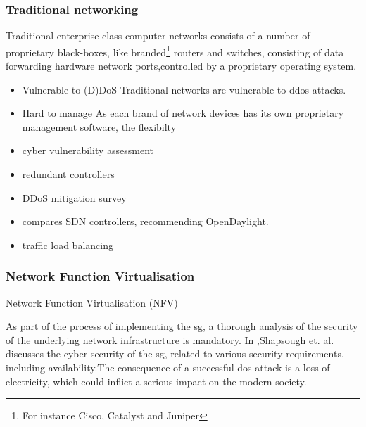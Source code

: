 \subsubsection{Traditional networking}
Traditional enterprise-class computer networks consists of a number of proprietary black-boxes, like branded\footnote{For instance Cisco, Catalyst and Juniper} routers and switches, consisting of data forwarding hardware network ports,controlled by a proprietary operating system. 

\begin{itemize}
\item{Vulnerable to (D)DoS} Traditional networks are vulnerable to \acrfull{ddos} attacks. \\

\item{Hard to manage} As each brand of network devices has its own proprietary management software, the flexibilty 
\end{itemize}

\begin{itemize}
\item cyber vulnerability assessment
\item redundant controllers

\item DDoS mitigation survey \cite{hameed2018sdn}
\item compares SDN controllers, recommending OpenDaylight\cite{arbettu2016security}.   


\item traffic load balancing\cite{ejaz2019traffic} \\ 

\end{itemize}



\subsubsection{Network Function Virtualisation}

Network Function Virtualisation (NFV) 




As part of the process of implementing the \acrshort{sg}, a thorough analysis of the security of the underlying network infrastructure is mandatory. 
In \cite{Shapsough2015},Shapsough et. al. discusses the cyber security of the \acrshort{sg}, related to various security requirements, including availability.The consequence of a successful \acrshort{dos} attack is a loss of electricity, which could inflict a serious impact on the modern society.

